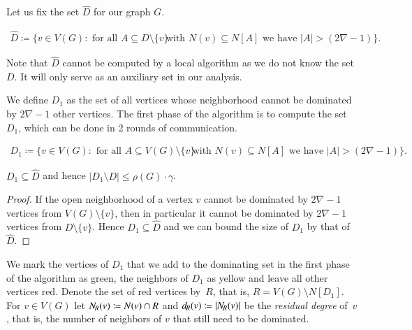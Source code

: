 Let us fix the set $\hat{D}$ for our graph $G$.
\begin{tcolorbox}
\vspace{-4mm}
    \begin{align*}
      \hat D\coloneqq \{v\in V(G) : \text{ for all } A\subseteq D\setminus \{v\}
      & \text{ with $N(v)\subseteq N[A]$} \text{ we have $|A|>(2\nabla-1)\}$.}
  \end{align*}
\end{tcolorbox}
\smallskip
Note that $\hat{D}$ cannot be computed by a local algorithm as we do
not know the set $D$. It will only serve as an auxiliary set in our
analysis.

\smallskip We define $D_1$ as the set of all vertices whose
neighborhood cannot be dominated by $2\nabla-1$ other vertices.
The first phase of the algorithm is to compute the set
$D_1$, which can be done in 2 rounds of communication.

\begin{tcolorbox}[colback=red!5!white,colframe=red!50!black]
  \vspace{-4mm}
  \begin{align*}
  D_1\coloneqq \{v\in V(G) : \text{ for all } A\subseteq V(G)\setminus \{v\}
  & \text{ with $N(v)\subseteq N[A]$ we have $|A|> (2\nabla-1)\}$.}
  \end{align*}
\end{tcolorbox}


\begin{lemma}\label{lem:size-D1}
  $D_1\subseteq \hat{D}$ and hence $|D_1\setminus D|\leq \rho(G)\cdot \gamma$.
\end{lemma}

\begin{proof}
  If the open neighborhood of a vertex $v$ cannot be dominated by $2\nabla-1$
  vertices from $V(G)\setminus\{v\}$, then in particular it cannot be
  dominated by $2\nabla-1$ vertices from $D\setminus\{v\}$.  Hence
  $D_1\subseteq \hat{D}$ and we can bound the size of $D_1$ by that of
  $\hat{D}$.
\end{proof}

\pagebreak
We mark the vertices of $D_1$ that we add to the dominating set in the
first phase of the algorithm as green, the neighbors of $D_1$ as
yellow and leave all other vertices red. Denote the set of red
vertices by~$R$, that is, $R=V(G)\setminus N[D_1]$.  For $v\in V(G)$
let $N_{\hspace{-1pt}R}(v)\coloneqq N(v)\cap R$ and $d_{\hspace{-1pt}R}(v)\coloneqq |N_{\hspace{-1pt}R}(v)|$
be the \emph{residual degree} of~$v$, that is, the number of neighbors
of $v$ that still need to be dominated.

